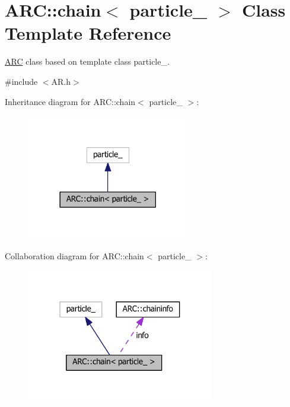 \hypertarget{classARC_1_1chain}{}\section{A\+RC\+:\+:chain$<$ particle\+\_\+ $>$ Class Template Reference}
\label{classARC_1_1chain}


\hyperlink{namespaceARC}{A\+RC} class based on template class particle\+\_\+.  




{\ttfamily \#include $<$A\+R.\+h$>$}



Inheritance diagram for A\+RC\+:\+:chain$<$ particle\+\_\+ $>$\+:
\nopagebreak
\begin{figure}[H]
\begin{center}
\leavevmode
\includegraphics[width=201pt]{classARC_1_1chain__inherit__graph}
\end{center}
\end{figure}


Collaboration diagram for A\+RC\+:\+:chain$<$ particle\+\_\+ $>$\+:
\nopagebreak
\begin{figure}[H]
\begin{center}
\leavevmode
\includegraphics[width=232pt]{classARC_1_1chain__coll__graph}
\end{center}
\end{figure}
